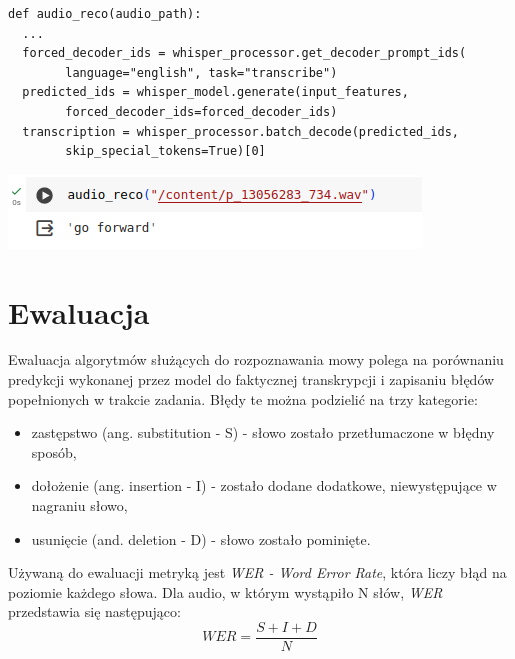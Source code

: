 \begin{lstlisting}
def audio_reco(audio_path):
  ...
  forced_decoder_ids = whisper_processor.get_decoder_prompt_ids(
        language="english", task="transcribe")
  predicted_ids = whisper_model.generate(input_features, 
        forced_decoder_ids=forced_decoder_ids)
  transcription = whisper_processor.batch_decode(predicted_ids, 
        skip_special_tokens=True)[0]
\end{lstlisting}

\begin{center}
    \includegraphics[width=0.95\linewidth]{files/wav2vectest.png}
    \label{fig:whisper}
\end{center}


\section{Ewaluacja}
\label{sec:ewaluacja}

Ewaluacja algorytmów służących do rozpoznawania mowy polega na porównaniu predykcji wykonanej przez model do faktycznej transkrypcji i zapisaniu błędów popełnionych w trakcie zadania. Błędy te można podzielić na trzy kategorie:
\begin{itemize}
    \item zastępstwo (ang. substitution - S) - słowo zostało przetłumaczone w błędny sposób,
    \item dołożenie (ang. insertion - I) - zostało dodane dodatkowe, niewystępujące w nagraniu słowo,
    \item usunięcie (and. deletion - D) - słowo zostało pominięte.
\end{itemize}
Używaną do ewaluacji metryką jest \textit{WER - Word Error Rate}, która liczy błąd na poziomie każdego słowa. Dla audio, w którym wystąpiło N słów, \textit{WER} przedstawia się następująco:
\begin{equation}
\label{eq:wer}
    WER = \frac{S+I+D}{N}
\end{equation}

